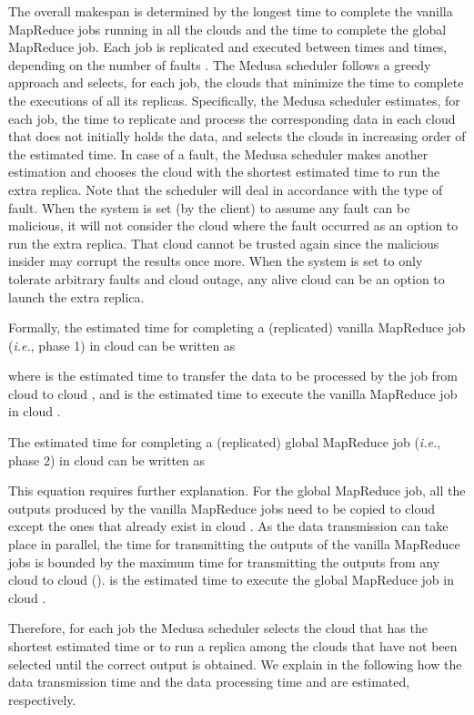 \documentclass[10pt, conference, compsocconf]{IEEEtran}
\begin{document}
The overall makespan is determined by the longest time to complete the vanilla MapReduce jobs running in all the clouds and the time to complete the global MapReduce job.
Each job is replicated and executed between  times and  times, depending on the number of faults . The Medusa scheduler follows a greedy approach and selects, for each job, the clouds that minimize the time to complete the executions of all its replicas. Specifically, the Medusa scheduler estimates, for each job, the time to replicate and process the corresponding data in each cloud that does not initially holds the data, and selects the  clouds in increasing order of the estimated time. In case of a fault, the Medusa scheduler makes another estimation and chooses the cloud with the shortest estimated time to run the extra replica.
Note that the scheduler will deal in accordance with the type of fault.
When the system is set (by the client) to assume any fault can be malicious, it will not consider the cloud where the fault occurred as an option to run the extra replica.
That cloud cannot be trusted again since the malicious insider may corrupt the results once more.
When the system is set to only tolerate arbitrary faults and cloud outage, any alive cloud can be an option to launch the extra replica.

Formally, the estimated time  for completing a (replicated) vanilla MapReduce job (\textit{i.e.}, phase 1) in cloud  can be written as

where  is the estimated time to transfer the data to be processed by the job from cloud  to cloud , and  is the estimated time to execute the vanilla MapReduce job in cloud .

The estimated time  for completing a (replicated) global MapReduce job (\textit{i.e.}, phase 2) in cloud  can be written as


This equation requires further explanation. For the global MapReduce job, all the outputs produced by the vanilla MapReduce jobs need to be copied to cloud  except the ones that already exist in cloud . As the data transmission can take place in parallel, the time for transmitting the outputs of the vanilla MapReduce jobs is bounded by the maximum time for transmitting the outputs from any cloud  to cloud  ().  is the estimated time to execute the global MapReduce job in cloud .

Therefore, for each job the Medusa scheduler selects the cloud  that has the shortest estimated time  or  to run a replica among the clouds that have not been selected until the correct output is obtained. We explain in the following how the data transmission time  and the data processing time  and  are estimated, respectively.
\end{document}
